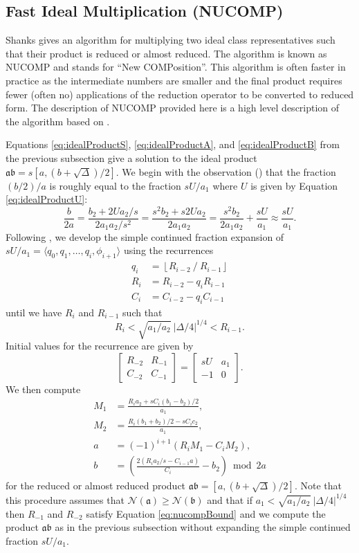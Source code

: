 \documentclass{ucalgthes1}
\theoremstyle{plain}
\theoremstyle{definition}
\newcommand{\matrixtt}[4]{\left[ \begin{array}{rr} #1 & #2 \\ #3 & #4 \end{array} \right]}
\newcommand{\floor}[1]{\left\lfloor #1 \right\rfloor}
\begin{document}
\subsection{Fast Ideal Multiplication (NUCOMP)}
\label{subsec:nucomp}

Shanks \cite{Shanks1989} gives an algorithm for multiplying two ideal class representatives such that their product is reduced or almost reduced.  The algorithm is known as NUCOMP and stands for ``New COMPosition''.  This algorithm is often faster in practice as the intermediate numbers are smaller and the final product requires fewer (often no) applications of the reduction operator to be converted to reduced form. The description of NUCOMP provided here is a high level description of the algorithm based on \cite[pp.119-123]{Jacobson2009}.

Equations \ref{eq:idealProductS}, \ref{eq:idealProductA}, and \ref{eq:idealProductB} from the previous subsection give a solution to the ideal product $\mathfrak a \mathfrak b = s[a, (b+\sqrt\Delta)/2]$.  We begin with the observation (\cite[p.119]{Jacobson2009}) that the fraction $(b/2)/a$ is roughly equal to the fraction $sU / a_1$ where $U$ is given by Equation \ref{eq:idealProductU}:
\[
	\frac{b}{2a} = \frac{b_2 + 2Ua_2/s}{2a_1a_2/s^2} 
	= \frac{s^2 b_2+s2Ua_2}{2a_1a_2}
	= \frac{s^2b_2}{2a_1a_2} + \frac{sU}{a_1}
	\approx \frac{sU}{a_1}.
\]
Following \cite[pp.120-121]{Jacobson2009}, we develop the simple continued fraction expansion of $sU/a_1 = \langle q_0, q_1, \dots, q_i, \phi_{i+1} \rangle$ using the recurrences
\begin{align*}
	q_i &= \floor{R_{i-2} ~/~ R_{i-1}} \\
	R_i &= R_{i-2} - q_i R_{i-1} \\
	C_i &= C_{i-2} - q_i C_{i-1}
\end{align*}
until we have $R_i$ and $R_{i-1}$ such that
\begin{equation}
\label{eq:nucompBound}
	R_i < \sqrt{a_1/a_2} ~ |\Delta/4|^{1/4} < R_{i-1}.
\end{equation}
Initial values for the recurrence are given by
\[
	\matrixtt{R_{-2}}{R_{-1}}{C_{-2}}{C_{-1}} = \matrixtt{sU}{a_1}{-1}{0}.
\]
We then compute
\begin{align*}
	M_1 &= \frac{R_i a_2 + sC_i(b_1-b_2)/2}{a_1}, \\
	M_2 &= \frac{R_i (b_1+b_2)/2 - s C_i c_2}{a_1}, \\
	a &= (-1)^{i+1} (R_i M_1  - C_i M_2), \\
	b &= \left( \frac{2(R_i a_2 /s - C_{i-1} a)}{C_i} - b_2 \right) \bmod 2a
\end{align*}
for the reduced or almost reduced product $\mathfrak a \mathfrak b = [a, (b + \sqrt\Delta)/2]$.  Note that this procedure assumes that $\mathcal N(\mathfrak a) \ge \mathcal N(\mathfrak b)$ and that if $a_1 < \sqrt{a_1/a_2} ~ |\Delta/4|^{1/4}$ then $R_{-1}$ and $R_{-2}$ satisfy Equation \ref{eq:nucompBound} and we compute the product $\mathfrak a \mathfrak b$ as in the previous subsection without expanding the simple continued fraction $sU/a_1$.
\end{document}
